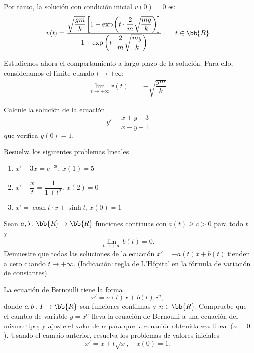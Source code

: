 \begin{ejercicio}
    Por tanto, la solución con condición inicial $v(0)=0$ es:
    \begin{equation*}
        v(t)=\dfrac{\sqrt{\dfrac{gm}{k}}\left[1-\exp\left(t\cdot \dfrac{2}{m}\sqrt{\dfrac{mg}{k}}\right)\right]}{1+\exp\left(t\cdot \dfrac{2}{m}\sqrt{\dfrac{mg}{k}}\right)} \qquad t\in \bb{R}
    \end{equation*}

    Estudiemos ahora el comportamiento a largo plazo de la solución. Para ello, consideramos el límite cuando $t\to +\infty$:
    \begin{align*}
        \lim_{t\to +\infty} v(t) &= -\sqrt{\dfrac{gm}{k}}
    \end{align*}

\end{ejercicio}

\begin{ejercicio}
    Calcule la solución de la ecuación
    \begin{equation*}
        y' = \dfrac{x + y - 3}{x - y - 1}
    \end{equation*}
    que verifica $y(0) = 1$.
\end{ejercicio}

\begin{ejercicio}
    Resuelva los siguientes problemas lineales
    \begin{enumerate}
        \item $x' + 3x = e^{-3t}$, $x(1) = 5$
        \item $x' - \dfrac{x}{t} = \dfrac{1}{1+t^2}$, $x(2) = 0$
        \item $x' = \cosh t \cdot x + \sinh t$, $x(0) = 1$
    \end{enumerate}
\end{ejercicio}

\begin{ejercicio}
    Sean $a, b : \bb{R} \to \bb{R}$ funciones continuas con $a(t) \geq c > 0$ para todo $t$ y
    \begin{equation*}
        \lim_{t \to +\infty} b(t) = 0.
    \end{equation*}
    Demuestre que todas las soluciones de la ecuación $x' = -a(t)x + b(t)$ tienden a cero cuando $t \to +\infty$. (Indicación: regla de L'Hôpital en la fórmula de variación de constantes)
\end{ejercicio}

\begin{ejercicio}
    La ecuación de Bernoulli tiene la forma
    \begin{equation*}
        x' = a(t)x + b(t)x^n,
    \end{equation*}
    donde $a, b : I \to \bb{R}$ son funciones continuas y $n \in \bb{R}$. Compruebe que el cambio de variable $y = x^\alpha$ lleva la ecuación de Bernoulli a una ecuación del mismo tipo, y ajuste el valor de $\alpha$ para que la ecuación obtenida sea lineal ($n = 0$). Usando el cambio anterior, resuelva los problemas de valores iniciales
    \begin{equation*}
        x' = x + t\sqrt{x}, \quad x(0) = 1.
    \end{equation*}
\end{ejercicio}

